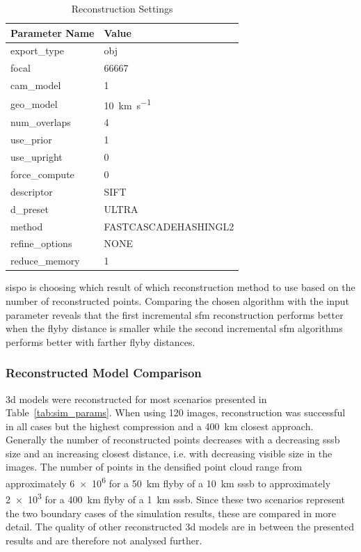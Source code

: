 \begin{table}[htb]
    \centering
    \caption{Reconstruction Settings}
    \label{tab:comp_settings}
    \begin{tabular}{l|l}
        \textbf{Parameter Name} & \textbf{Value} \\ \hline
        export\_type       & obj   \\
        focal & 66667 \\
        cam\_model & \SI{1}{}     \\
        geo\_model & \SI{10}{\kilo\meter\per\second} \\
        num\_overlaps  & \SI{4}{} \\
        use\_prior & \SI{1}{} \\
        use\_upright & \SI{0}{} \\
        force\_compute & \SI{0}{} \\
        descriptor & SIFT \\
        d\_preset & ULTRA \\
        method & FASTCASCADEHASHINGL2 \\
        refine\_options & NONE \\
        reduce\_memory & 1
    \end{tabular}
\end{table}

\gls{sispo} is choosing which result of which reconstruction method to use based on the number of reconstructed points. Comparing the chosen algorithm with the input parameter reveals that the first incremental \gls{sfm} reconstruction performs better when the flyby distance is smaller while the second incremental \gls{sfm} algorithms performs better with farther flyby distances.

\subsubsection{Reconstructed Model Comparison}
\Gls{3d} models were reconstructed for most scenarios presented in Table~\ref{tab:sim_params}. When using \SI{120}{} images, reconstruction was successful in all cases but the highest compression and a \SI{400}{\kilo\meter} closest approach.
Generally the number of reconstructed points decreases with a decreasing \gls{sssb} size and an increasing closest distance, i.e. with decreasing visible size in the images.
The number of points in the densified point cloud range from approximately \SI{6e6}{} for a \SI{50}{\kilo\meter} flyby of a \SI{10}{\kilo\meter} \gls{sssb} to approximately \SI{2e3}{} for a \SI{400}{\kilo\meter} flyby of a \SI{1}{\kilo\meter} \gls{sssb}. Since these two scenarios represent the two boundary cases of the simulation results, these are compared in more detail. The quality of other reconstructed \gls{3d} models are in between the presented results and are therefore not analysed further.

